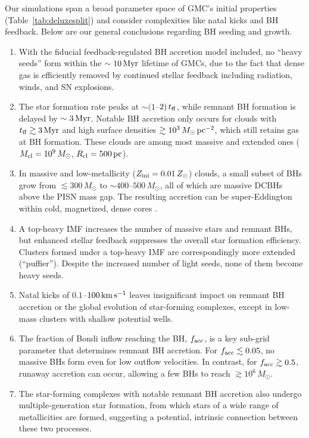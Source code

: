 \documentclass[twocolumn]{aastex631}
\begin{document}
Our simulations span a broad parameter space of GMC's initial properties (Table~\ref{tab:deluxesplit}) and consider complexities like natal kicks and BH feedback. Below are our general conclusions regarding BH seeding and growth.
\begin{enumerate}
    \item With the fiducial feedback-regulated BH accretion model included, no ``heavy seeds'' form within the $\sim 10\,\rm Myr$ lifetime of GMCs, due to the fact that dense gas is efficiently removed by continued stellar feedback including radiation, winds, and SN explosions.
    
    \item The star formation rate peaks at $\sim (1$--$2)\,t_{\rm ff}$, while remnant BH formation is delayed by $\sim 3\,\rm Myr$. Notable BH accretion only occurs for clouds with $t_{\rm ff}\gtrsim 3\,\rm Myr$ and high surface densities $\gtrsim 10^3\,M_\odot\,{\rm pc}^{-2}$, which still retains gas at BH formation. These clouds are among most massive and extended ones ($M_{\rm cl}=10^9\,M_\odot$, $R_{\rm cl}=500\,\rm pc$).
    
    \item In massive and low-metallicity ($Z_{\rm ini}=0.01\,Z_\odot$) clouds, a small subset of BHs grow from $\lesssim 300\,M_\odot$ to $\sim 400$--$500\,M_\odot$, all of which are massive DCBHs above the PISN mass gap. The resulting accretion can be super-Eddington within cold, magnetized, dense cores \citep[similar to][]{ShiKremerGrudic_2023MNRAS.518.3606S}.
    
    \item A top-heavy IMF increases the number of massive stars and remnant BHs, but enhanced stellar feedback suppresses the overall star formation efficiency. Clusters formed under a top-heavy IMF are correspondingly more extended (``puffier''). Despite the increased number of light seeds, none of them become heavy seeds.
    
    \item Natal kicks of $0.1$--$100\,\rm km\,s^{-1}$ leaves insignificant impact on remnant BH accretion or the global evolution of star-forming complexes, except in low-mass clusters with shallow potential wells.
    
    \item The fraction of Bondi inflow reaching the BH, $f_{\rm acc}$, is a key sub-grid parameter that determines remnant BH accretion. For $f_{\rm acc}\lesssim 0.05$, no massive BHs form even for low outflow velocities. In contrast, for $f_{\rm acc}\gtrsim 0.5$, runaway accretion can occur, allowing a few BHs to reach $\gtrsim 10^6\,M_\odot$.

    \item The star-forming complexes with notable remnant BH accretion also undergo multiple-generation star formation, from which stars of a wide range of metallicities are formed, suggesting a potential, intrinsic connection between these two processes.
\end{enumerate}
\end{document}
